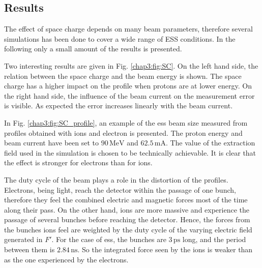 \begin{refsection}
  \subsection{Results}
  The effect of space charge depends on many beam parameters, therefore several simulations has been done to cover a wide range of ESS conditions. In the following only a small amount of the results is presented. %
  

  Two interesting results are given in Fig. \ref{chap3:fig:SC}. On the left hand side, the relation between the space charge and the beam energy is shown. The space charge has a higher impact on the profile when protons are at lower energy. On the right hand side, the influence of the beam current on the measurement error is visible. As expected the error increases linearly with the beam current.


  In Fig. \ref{chap3:fig:SC_profile}, an example of the \acrshort{ess} beam size measured from profiles obtained with ions and electron is presented. The proton energy and beam current have been set to $90\,\mathrm{MeV}$ and $62.5\,\mathrm{mA}$. The value of the extraction field used in the simulation is chosen to be technically achievable. It is clear that the effect is stronger for electrons than for ions.


  The duty cycle of the beam plays a role in the distortion of the profiles. Electrons, being light, reach the detector within the passage of one bunch, therefore they feel the combined electric and magnetic forces most of the time along their pass. On the other hand, ions are more massive and experience the passage of several bunches before reaching the detector.
  Hence, the forces from the bunches ions feel are weighted by the duty cycle of the varying electric field generated in $F\prime$. For the case of \acrshort{ess}, the bunches are $3\,\mathrm{ps}$ long, and the period between them is $2.84\,\mathrm{ns}$. So the integrated force seen by the ions is weaker than as the one experienced by the electrons.


\end{refsection}
